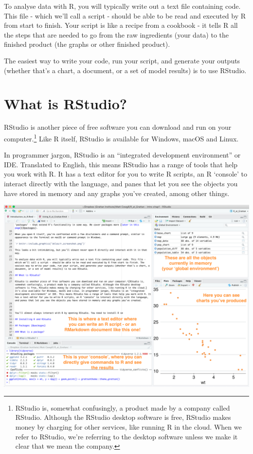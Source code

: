 \documentclass[]{book}
\begin{document}
To analyse data with R, you will typically write out a text file containing code. This file - which we'll call a script - should be able to be read and executed by R from start to finish. Your script is like a recipe from a cookbook - it tells R all the steps that are needed to go from the raw ingredients (your data) to the finished product (the graphs or other finished product).

The easiest way to write your code, run your script, and generate your outputs (whether that's a chart, a document, or a set of model results) is to use RStudio.

\hypertarget{what-is-rstudio}{%
\section{What is RStudio?}\label{what-is-rstudio}}

RStudio is another piece of free software you can download and run on your computer.\footnote{RStudio is, somewhat confusingly, a product made by a company called RStudio. Although the RStudio desktop software is free, RStudio makes money by charging for other services, like running R in the cloud. When we refer to RStudio, we're referring to the desktop software unless we make it clear that we mean the company.} Like R itself, RStudio is available for Windows, macOS and Linux.

In programmer jargon, RStudio is an ``integrated development environment'' or IDE. Translated to English, this means RStudio has a range of tools that help you work with R. It has a text editor for you to write R scripts, an R `console' to interact directly with the language, and panes that let you see the objects you have stored in memory and any graphs you've created, among other things.

\includegraphics[width=18.4in]{atlas/rstudio_screenshot}
\end{document}
